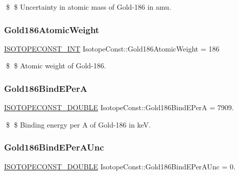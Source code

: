 \$ \$ Uncertainty in atomic mass of Gold-\/186 in amu. \mbox{\label{group___isotope_const-_gold-_au186_ga19a288bfa88b00698bb3e51ea166ebcc}} 
\subsubsection{\texorpdfstring{Gold186\+Atomic\+Weight}{Gold186AtomicWeight}}
{\footnotesize\ttfamily \mbox{\hyperlink{group___isotope_const-_macros_ga5f18360b3e99483a35c32d789e62621c}{I\+S\+O\+T\+O\+P\+E\+C\+O\+N\+S\+T\+\_\+\+I\+NT}} Isotope\+Const\+::\+Gold186\+Atomic\+Weight = 186}

\$ \$ Atomic weight of Gold-\/186. \mbox{\label{group___isotope_const-_gold-_au186_gabe1623771628882a73289aac3228506d}} 
\subsubsection{\texorpdfstring{Gold186\+Bind\+E\+PerA}{Gold186BindEPerA}}
{\footnotesize\ttfamily \mbox{\hyperlink{group___isotope_const-_macros_ga8f45a7272ce02c0b4c65c44636ed719a}{I\+S\+O\+T\+O\+P\+E\+C\+O\+N\+S\+T\+\_\+\+D\+O\+U\+B\+LE}} Isotope\+Const\+::\+Gold186\+Bind\+E\+PerA = 7909.}

\$ \$ Binding energy per A of Gold-\/186 in keV. \mbox{\label{group___isotope_const-_gold-_au186_ga78c6edae20c2c1e34a9126fdcd9622cc}} 
\subsubsection{\texorpdfstring{Gold186\+Bind\+E\+Per\+A\+Unc}{Gold186BindEPerAUnc}}
{\footnotesize\ttfamily \mbox{\hyperlink{group___isotope_const-_macros_ga8f45a7272ce02c0b4c65c44636ed719a}{I\+S\+O\+T\+O\+P\+E\+C\+O\+N\+S\+T\+\_\+\+D\+O\+U\+B\+LE}} Isotope\+Const\+::\+Gold186\+Bind\+E\+Per\+A\+Unc = 0.}

